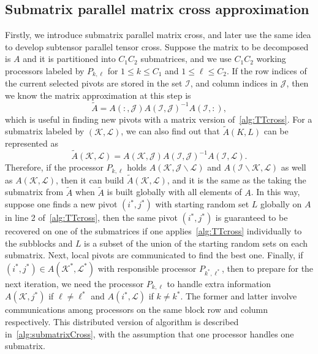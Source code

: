 \documentclass[11pt,a4paper,review]{siamart220329}
\begin{document}
\subsection{Submatrix parallel matrix cross approximation}
\label{sec:submatrixCross}
Firstly, we introduce submatrix parallel matrix cross, and later use the same idea to develop subtensor parallel tensor cross. Suppose the matrix to be decomposed is $A$ and it is partitioned into $C_1C_2$ submatrices, and we use $C_1C_2$ working processors labeled by $P_{k,\ell}$ for $1 \le k \le C_1$ and $1 \le \ell \le C_2$. If the row indices of the current selected pivots are stored in the set $\mathcal{I}$, and column indices in $\mathcal{J}$, then we know the matrix approximation at this step is 
\[ \tilde{A} = A(:,\mathcal{J})A(\mathcal{I},\mathcal{J})^{-1}A(\mathcal{I},:), \]
which is useful in finding new pivots with a matrix version of~\cref{alg:TTcross}. For a submatrix labeled by $(\mathcal{K},\mathcal{L})$, we can also find out that $\tilde{A}(K,L)$ can be represented as
\[ \tilde{A}(\mathcal{K},\mathcal{L}) =  A(\mathcal{K},\mathcal{J})A(\mathcal{I},\mathcal{J})^{-1}A(\mathcal{I},\mathcal{L}). \]
Therefore, if the processor $P_{k,\ell}$ holds $A(\mathcal{K},\mathcal{J}\backslash \mathcal{L})$ and $A(\mathcal{I} \backslash \mathcal{K},\mathcal{L})$ as well as $A(\mathcal{K},\mathcal{L})$, then it can build $\tilde{A}(\mathcal{K},\mathcal{L})$, and it is the same as the taking the submatrix from $\tilde{A}$ when $\tilde{A}$ is built globally with all elements of $A$. In this way, suppose one finds a new pivot $(i^*,j^*)$ with starting random set $L$ globally on $A$ in line 2 of~\cref{alg:TTcross}, then the same pivot $(i^*,j^*)$ is guaranteed to be recovered on one of the submatrices if one applies~\cref{alg:TTcross} individually to the subblocks and $L$ is a subset of the union of the starting random sets on each submatrix. Next, local pivots are communicated to find the best one. Finally, if $(i^*,j^*) \in A(\mathcal{K}^*,\mathcal{L}^*)$ with responsible processor $P_{k^*,\ell^*}$, then to prepare for the next iteration, we need the processor $P_{k,\ell}$ to handle extra information $A(\mathcal{K},j^*)$ if $\ell \neq \ell^*$ and $A(i^*,\mathcal{L})$ if $k \neq k^*$. The former and latter involve communications among processors on the same block row and column respectively. This distributed version of algorithm is described in~\cref{alg:submatrixCross}, with the assumption that one processor handles one submatrix.
\end{document}
